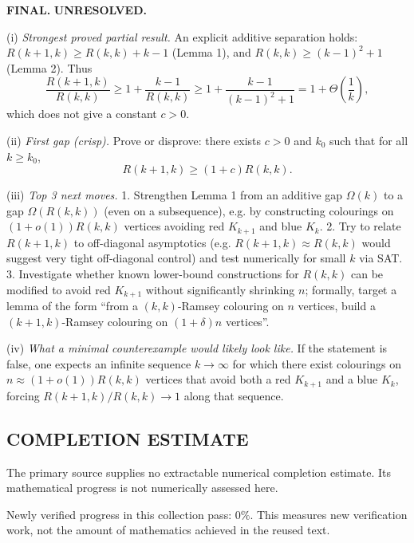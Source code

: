 \textbf{FINAL.} \textbf{UNRESOLVED.}

(i) \emph{Strongest proved partial result.} An explicit additive separation holds: $R(k+1,k)\ge R(k,k)+k-1$ (Lemma 1), and $R(k,k)\ge (k-1)^2+1$ (Lemma 2).
Thus
\[
\frac{R(k+1,k)}{R(k,k)} \ge 1 + \frac{k-1}{R(k,k)} \ge 1 + \frac{k-1}{(k-1)^2+1} = 1 + \Theta\!\left(\frac{1}{k}\right),
\]
which does not give a constant $c>0$.

(ii) \emph{First gap (crisp).} Prove or disprove: there exists $c>0$ and $k_0$ such that for all $k\ge k_0$,
\[R(k+1,k)\ge (1+c)R(k,k).\]

(iii) \emph{Top 3 next moves.}
1. Strengthen Lemma 1 from an additive gap $\Omega(k)$ to a gap $\Omega(R(k,k))$ (even on a subsequence), e.g. by constructing colourings on $(1+o(1))R(k,k)$ vertices avoiding red $K_{k+1}$ and blue $K_k$.
2. Try to relate $R(k+1,k)$ to off-diagonal asymptotics (e.g. $R(k+1,k)\approx R(k,k)$ would suggest very tight off-diagonal control) and test numerically for small $k$ via SAT.
3. Investigate whether known lower-bound constructions for $R(k,k)$ can be modified to avoid red $K_{k+1}$ without significantly shrinking $n$; formally, target a lemma of the form ``from a $(k,k)$-Ramsey colouring on $n$ vertices, build a $(k+1,k)$-Ramsey colouring on $(1+\delta)n$ vertices''.

(iv) \emph{What a minimal counterexample would likely look like.} If the statement is false, one expects an infinite sequence $k\to\infty$ for which there exist colourings on $n\approx (1+o(1))R(k,k)$ vertices that avoid both a red $K_{k+1}$ and a blue $K_k$, forcing $R(k+1,k)/R(k,k)\to 1$ along that sequence.




\subsection*{COMPLETION ESTIMATE}
The primary source supplies no extractable numerical completion estimate. Its mathematical progress is not numerically assessed here.

Newly verified progress in this collection pass: $0\%$. This measures new verification work, not the amount of mathematics achieved in the reused text.
